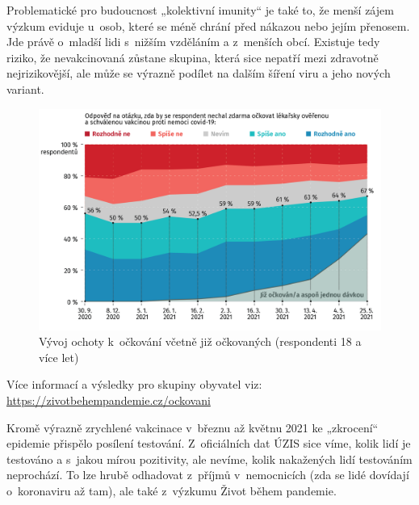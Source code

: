 Problematické pro budoucnost „kolektivní imunity“ je také to, že menší zájem výzkum eviduje u~osob, které se méně chrání před nákazou nebo jejím přenosem. Jde právě o~mladší lidi s nižším vzděláním a z menších obcí. Existuje tedy riziko, že nevakcinovaná zůstane skupina, která sice nepatří mezi zdravotně nejrizikovější, ale může se výrazně podílet na dalším šíření viru a jeho nových variant.

\begin{figure}[ht]
    \centering
    \includegraphics[width=\textwidth]{./pic/zbp-graf6.png}
    \caption{Vývoj ochoty k očkování včetně již očkovaných (respondenti 18 a více let)}
    \label{fig:zbp6}
\end{figure}

Více informací a výsledky pro skupiny obyvatel viz: \url{https://zivotbehempandemie.cz/ockovani}

Kromě výrazně zrychlené vakcinace v březnu až květnu 2021 ke „zkrocení“ epidemie přispělo posílení testování. Z oficiálních dat ÚZIS sice víme, kolik lidí je testováno a s jakou mírou pozitivity, ale nevíme, kolik nakažených lidí testováním neprochází. To lze hrubě odhadovat z příjmů v nemocnicích (zda se lidé dovídají o~koronaviru až tam), ale také z výzkumu Život během pandemie. 

